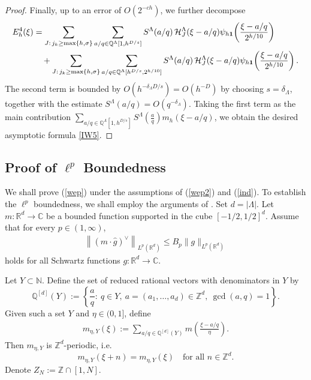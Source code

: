 \documentclass[10pt,a4paper]{amsart}
\numberwithin{equation}{section}
\begin{document}
\begin{proof}
Finally, up to an error of $O(2^{-ch})$, we further decompose
\begin{align*}
E^4_h(\xi)
&=
\sum_{J:\, j_k\ge \max\{h,\sigma\}} 
\sum_{a/q\in \mathbb{Q}^{\Lambda}[1,h^{D/s}]}  
S^{\Lambda}(a/q)\, \mathcal{H}^{\Lambda}_J(\xi-a/q)
\psi_{h{\bf 1}}\!\left(\frac{\xi-a/q}{2^{h/10}}\right)\\
&\quad+
\sum_{J:\, j_k\ge \max\{h,\sigma\}} 
\sum_{a/q\in \mathbb{Q}^{\Lambda}[h^{D/s},2^{h/10}]}  
S^{\Lambda}(a/q)\, \mathcal{H}^{\Lambda}_J(\xi-a/q)
\psi_{h{\bf 1}}\!\left(\frac{\xi-a/q}{2^{h/10}}\right).
\end{align*}
The second term is bounded by $O(h^{-\delta_{\Lambda} D/s})=O(h^{-D})$ by choosing $s=\delta_{\Lambda}$, together with the estimate $S^{\Lambda}(a/q)=O(q^{-\delta_{\Lambda}})$. 
Taking the first term as the main contribution $ 
 \sum_{a/q\in \mathbb{Q}^{\Lambda}[1,h^{D/s}]} S^{\Lambda}\!\left(\frac{a}{q}\right) m_{h}( \xi-a/q )$, we obtain the desired asymptotic formula \eqref{IW5}.
\end{proof}



 

















 


\subsection{Proof of $\ell^{p}$ Boundedness}
We shall prove (\ref{wep}) under the assumptions of   (\ref{wep2}) and  (\ref{ind}).
To establish the $\ell^p$ boundedness, we shall employ the arguments of \cite{IW}. 
Set $d=|\Lambda|$. Let $m:\mathbb{R}^{d}\to\mathbb{C}$ be a bounded function supported in the cube $[-1/2,1/2]^d$. 
Assume that for every $p\in(1,\infty)$,
\begin{align}\label{IW1}
\left\|(m \cdot \widehat{g})^{\vee}\right\|_{L^{p}(\mathbb{R}^{d})}
\leq B_{p}\|g\|_{L^{p}(\mathbb{R}^{d})}
\end{align}
holds for all Schwartz functions $g:\mathbb{R}^{d}\to\mathbb{C}$.

Let $Y\subset \mathbb{N}$. Define the set of reduced rational vectors with denominators in $Y$ by
\[
\mathbb{Q}^{[d]}(Y)
:=\left\{\frac{a}{q}:\ q\in Y,\ a=(a_1,\dots,a_d)\in\mathbb{Z}^{d},\ \gcd(a,q)=1\right\}.
\]
Given such a set $Y$ and $\eta\in(0,1]$, define
\begin{align}\label{91k}
m_{\eta,Y}(\xi)
:=\sum_{a/q\in \mathbb{Q}^{[d]}(Y)} m\!\left(\frac{\xi-a/q}{\eta}\right).
\end{align}
Then $m_{\eta,Y}$ is $\mathbb{Z}^d$-periodic, i.e.
\[
m_{\eta,Y}(\xi+n)=m_{\eta,Y}(\xi)\quad \text{for all } n\in\mathbb{Z}^d.
\]
Denote $Z_N:=\mathbb{Z}\cap[1,N]$.
\end{document}

